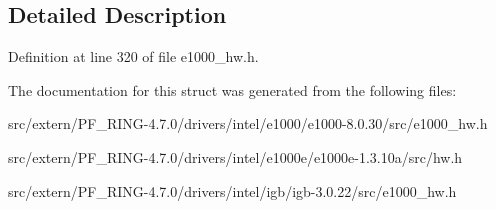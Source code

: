 

\subsection{Detailed Description}


Definition at line 320 of file e1000\_\-hw.h.



The documentation for this struct was generated from the following files:\begin{DoxyCompactItemize}
\item 
src/extern/PF\_\-RING-\/4.7.0/drivers/intel/e1000/e1000-\/8.0.30/src/e1000\_\-hw.h\item 
src/extern/PF\_\-RING-\/4.7.0/drivers/intel/e1000e/e1000e-\/1.3.10a/src/hw.h\item 
src/extern/PF\_\-RING-\/4.7.0/drivers/intel/igb/igb-\/3.0.22/src/e1000\_\-hw.h\end{DoxyCompactItemize}
